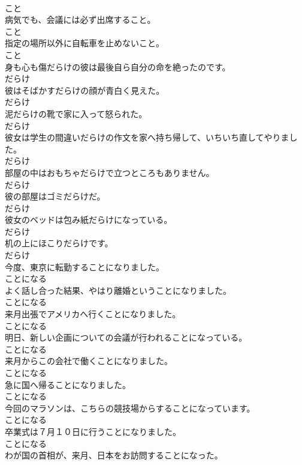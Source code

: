 \documentclass[8pt]{extreport}
\begin{document}
\begin{CJK}{UTF8}{min}
\\	こと
\\	病気でも、会議には必ず出席すること。	
\\	こと
\\	指定の場所以外に自転車を止めないこと。	
\\	こと
\\	身も心も傷だらけの彼は最後自ら自分の命を絶ったのです。	
\\	だらけ
\\	彼はそばかすだらけの顔が青白く見えた。	
\\	だらけ
\\	泥だらけの靴で家に入って怒られた。	
\\	だらけ
\\	彼女は学生の間違いだらけの作文を家へ持ち帰して、いちいち直してやりました。	
\\	だらけ
\\	部屋の中はおもちゃだらけで立つところもありません。	
\\	だらけ
\\	彼の部屋はゴミだらけだ。	
\\	だらけ
\\	彼女のベッドは包み紙だらけになっている。	
\\	だらけ
\\	机の上にほこりだらけです。	
\\	だらけ
\\	今度、東京に転勤することになりました。	
\\	ことになる
\\	よく話し合った結果、やはり離婚ということになりました。	
\\	ことになる
\\	来月出張でアメリカへ行くことになりました。	
\\	ことになる
\\	明日、新しい企画についての会議が行われることになっている。	
\\	ことになる
\\	来月からこの会社で働くことになりました。	
\\	ことになる
\\	急に国へ帰ることになりました。	
\\	ことになる
\\	今回のマラソンは、こちらの競技場からすることになっています。	
\\	ことになる
\\	卒業式は７月１０日に行うことになりました。	
\\	ことになる
\\	わが国の首相が、来月、日本をお訪問することになった。	

\end{CJK}
\end{document}
